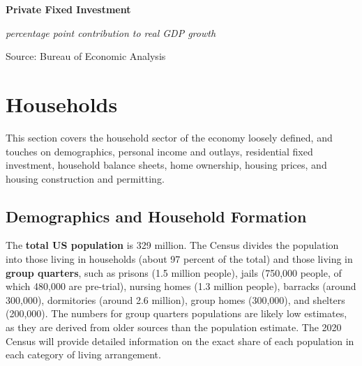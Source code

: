\documentclass{report}
\makeatletter
\newcommand{\tbllink}[1]{\href{https://raw.githubusercontent.com/bdecon/US-chartbook/master/chartbook/data/#1}{\faTable}}
\newcommand*\short[1]{\expandafter\@gobbletwo\number\numexpr#1\relax}
\newcommand{\sbar}[4]{
		\addplot[ybar stacked, bar width=2.6pt, draw opacity=0, fill=#1] 
			table [x=#2, y=#3, col sep=comma]{#4};}
\newcommand{\dateaxisticks}{
		date coordinates in=x, axis line style={draw=none},
		xmax={2020-08-10},
		max space between ticks=40,	    
		xtick={{1990-01-01}, {1992-01-01}, {1994-01-01}, 
			{1996-01-01}, {1998-01-01}, {2000-01-01}, 
			{2002-01-01}, {2004-01-01}, {2006-01-01},
			{2008-01-01}, {2010-01-01}, {2012-01-01}, {2014-01-01},
		    {2016-01-01}, {2018-01-01}, {2020-01-01}},
		minor xtick={{1989-01-01}, {1991-01-01}, {1993-01-01},
			{1995-01-01}, {1997-01-01}, {1999-01-01}, 
			{2001-01-01}, {2003-01-01}, {2005-01-01}, {2007-01-01},
		    {2009-01-01}, {2011-01-01}, {2013-01-01}, {2015-01-01},
		    {2017-01-01}, {2019-01-01}},
		enlarge y limits={0.06}, enlarge x limits={0.01},
		}
\newcommand{\bbar}[2]{extra #1 ticks = {{#2}}, extra #1 tick labels = ,
		extra #1 tick style = {grid=major, grid style={thick, black!25}},}
\newcommand{\rbars}{
		\fill[color=black!10] (axis cs:{1990-07-01},\pgfkeysvalueof{/pgfplots/ymin}) rectangle 
			(axis cs:{1991-03-01}, \pgfkeysvalueof{/pgfplots/ymax});
		\fill[color=black!10] (axis cs:{2007-12-01},\pgfkeysvalueof{/pgfplots/ymin}) rectangle 
			(axis cs:{2009-07-01}, \pgfkeysvalueof{/pgfplots/ymax});
		\fill[color=black!10] (axis cs:{2001-03-01},\pgfkeysvalueof{/pgfplots/ymin}) rectangle 
			(axis cs:{2001-11-01}, \pgfkeysvalueof{/pgfplots/ymax});
		\fill[color=black!10] (axis cs:{2020-02-01},\pgfkeysvalueof{/pgfplots/ymin}) rectangle 
			(axis cs:{2020-09-01}, \pgfkeysvalueof{/pgfplots/ymax});}
\makeatother
\begin{document}
{{{\begin{minipage}{0.76\textwidth}
 

\vspace{5mm} 

\normalsize \textbf{Private Fixed Investment}

\footnotesize{\textit{percentage point contribution to real GDP growth}}

\hspace*{-3mm} 

\footnotesize{Source: Bureau of Economic Analysis} \hfill \tbllink{inv.csv} 
\end{minipage}

\newpage
\section*{\color{darkgray}\LARGE Households}
\label{sec:hh}

\begin{minipage}{0.76\textwidth}
\small This section covers the household sector of the economy loosely defined, and touches on demographics, personal income and outlays, residential fixed investment, household balance sheets, home ownership, housing prices, and housing construction and permitting.


\subsection*{\color{black!70} \seriffont Demographics and Household Formation}

The \textbf{total US population} is 329 million. The Census divides the population into those living in households (about 97 percent of the total) and those living in \textbf{group quarters}, such as prisons (1.5 million people), jails (750,000 people, of which 480,000 are pre-trial), nursing homes (1.3 million people), barracks (around 300,000), dormitories (around 2.6 million), group homes (300,000), and shelters (200,000). The numbers for group quarters populations are likely low estimates, as they are derived from older sources than the population estimate. The 2020 Census will provide detailed information on the exact share of each population in each category of living arrangement.\\ 


\end{minipage}}}}
\end{document}

